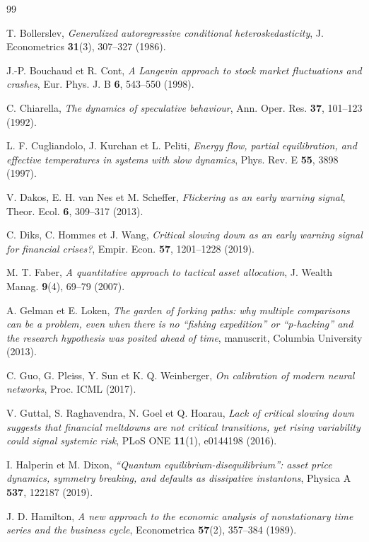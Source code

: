 \documentclass[11pt,a4paper]{article}
\begin{document}
\begin{thebibliography}{99}\small

T. Bollerslev, \emph{Generalized autoregressive conditional heteroskedasticity}, J. Econometrics \textbf{31}(3), 307--327 (1986).

J.-P. Bouchaud et R. Cont, \emph{A Langevin approach to stock market fluctuations and crashes}, Eur. Phys. J. B \textbf{6}, 543--550 (1998).

C. Chiarella, \emph{The dynamics of speculative behaviour}, Ann. Oper. Res. \textbf{37}, 101--123 (1992).

L. F. Cugliandolo, J. Kurchan et L. Peliti, \emph{Energy flow, partial equilibration, and effective temperatures in systems with slow dynamics}, Phys. Rev. E \textbf{55}, 3898 (1997).

V. Dakos, E. H. van Nes et M. Scheffer, \emph{Flickering as an early warning signal}, Theor. Ecol. \textbf{6}, 309--317 (2013).

C. Diks, C. Hommes et J. Wang, \emph{Critical slowing down as an early warning signal for financial crises?}, Empir. Econ. \textbf{57}, 1201--1228 (2019).

M. T. Faber, \emph{A quantitative approach to tactical asset allocation}, J. Wealth Manag. \textbf{9}(4), 69--79 (2007).

A. Gelman et E. Loken, \emph{The garden of forking paths: why multiple comparisons can be a problem, even when there is no ``fishing expedition'' or ``p-hacking'' and the research hypothesis was posited ahead of time}, manuscrit, Columbia University (2013).

C. Guo, G. Pleiss, Y. Sun et K. Q. Weinberger, \emph{On calibration of modern neural networks}, Proc. ICML (2017).

V. Guttal, S. Raghavendra, N. Goel et Q. Hoarau, \emph{Lack of critical slowing down suggests that financial meltdowns are not critical transitions, yet rising variability could signal systemic risk}, PLoS ONE \textbf{11}(1), e0144198 (2016).

I. Halperin et M. Dixon, \emph{``Quantum equilibrium-disequilibrium'': asset price dynamics, symmetry breaking, and defaults as dissipative instantons}, Physica A \textbf{537}, 122187 (2019).

J. D. Hamilton, \emph{A new approach to the economic analysis of nonstationary time series and the business cycle}, Econometrica \textbf{57}(2), 357--384 (1989).


\end{thebibliography}
\end{document}
